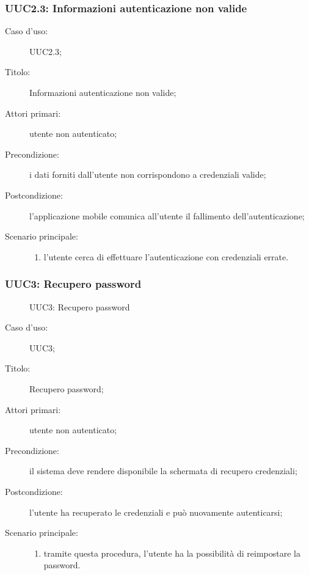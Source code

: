 \documentclass[../../../analisi-dei-requisiti.tex]{subfiles}
\begin{document}
\subsubsection{UUC2.3: Informazioni autenticazione non valide}%
\label{subs:UUC2.3}
\begin{description}
  \item[Caso d'uso:] UUC2.3;
  \item[Titolo:] Informazioni autenticazione non valide;
  \item[Attori primari:] utente non autenticato;
  \item[Precondizione:] i dati forniti dall'utente non corrispondono a credenziali valide;
  \item[Postcondizione:] l'applicazione mobile comunica all'utente il fallimento dell'autenticazione;
  \item[Scenario principale:]
        \begin{enumerate}
          \item l'utente cerca di effettuare l'autenticazione con credenziali errate.
        \end{enumerate}
\end{description}


\subsubsection{UUC3: Recupero password}%
\label{subs:UUC3}

\begin{figure}[H]
  \centering
  \caption{UUC3: Recupero password}%
  \label{fig:uuc3}
\end{figure}

\begin{description}
  \item[Caso d'uso:] UUC3;
  \item[Titolo:] Recupero password;
  \item[Attori primari:] utente non autenticato;
  \item[Precondizione:] il sistema deve rendere disponibile la schermata di recupero credenziali;
  \item[Postcondizione:] l'utente ha recuperato le credenziali e può nuovamente autenticarsi;
  \item[Scenario principale:]
        \begin{enumerate}
          \item tramite questa procedura, l'utente ha la possibilità di reimpostare la password.
        \end{enumerate}
\end{description}
\end{document}
